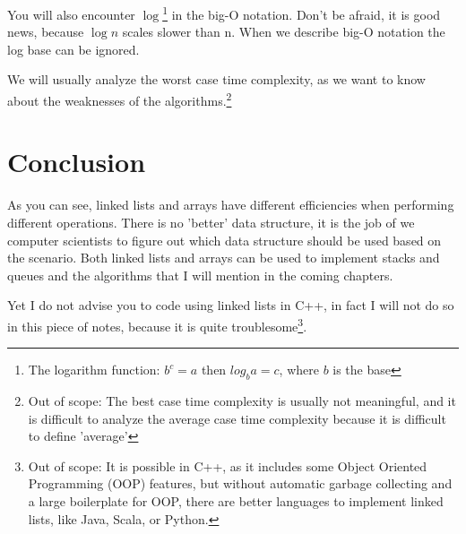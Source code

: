 You will also encounter $\log$\footnote{The logarithm function: $b^c = a$ then $log_b a = c$, where $b$ is the base} in the big-O notation. Don't be afraid, it is good news, because $\log n$ scales slower than n. When we describe big-O notation the log base can be ignored.

We will usually analyze the worst case time complexity, as we want to know about the weaknesses of the algorithms.\footnote{Out of scope: The best case time complexity is usually not meaningful, and it is difficult to analyze the average case time complexity because it is difficult to define 'average'}

\section{Conclusion}
As you can see, linked lists and arrays have different efficiencies when performing different operations. There is no 'better' data structure, it is the job of we computer scientists to figure out which data structure should be used based on the scenario. Both linked lists and arrays can be used to implement stacks and queues and the algorithms that I will mention in the coming chapters. 

Yet I do not advise you to code using linked lists in C++, in fact I will not do so in this piece of notes, because it is quite troublesome\footnote{Out of scope: It is possible in C++, as it includes some Object Oriented Programming (OOP) features, but without automatic garbage collecting and a large boilerplate for OOP, there are better languages to implement linked lists, like Java, Scala, or Python.
}.

